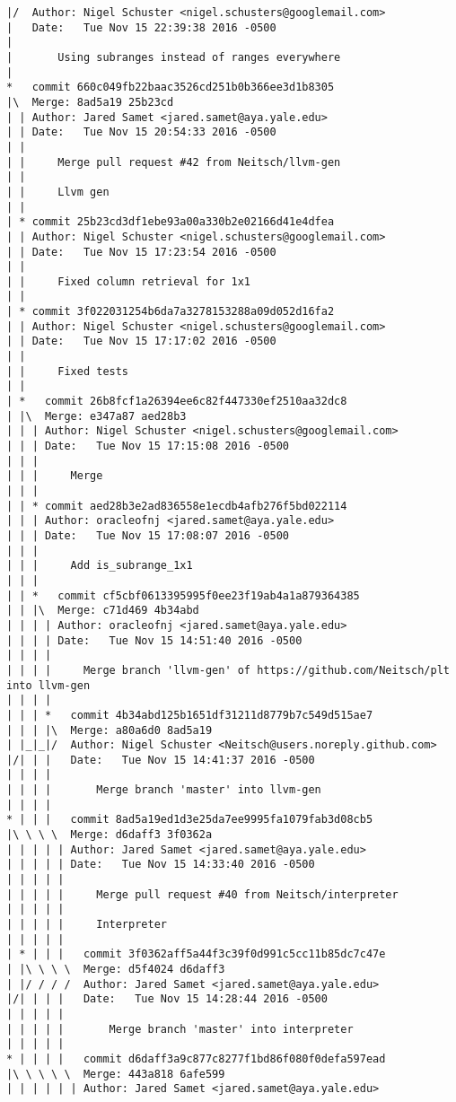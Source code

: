 \begin{lstlisting}
|/  Author: Nigel Schuster <nigel.schusters@googlemail.com>
|   Date:   Tue Nov 15 22:39:38 2016 -0500
|   
|       Using subranges instead of ranges everywhere
|    
*   commit 660c049fb22baac3526cd251b0b366ee3d1b8305
|\  Merge: 8ad5a19 25b23cd
| | Author: Jared Samet <jared.samet@aya.yale.edu>
| | Date:   Tue Nov 15 20:54:33 2016 -0500
| | 
| |     Merge pull request #42 from Neitsch/llvm-gen
| |     
| |     Llvm gen
| |   
| * commit 25b23cd3df1ebe93a00a330b2e02166d41e4dfea
| | Author: Nigel Schuster <nigel.schusters@googlemail.com>
| | Date:   Tue Nov 15 17:23:54 2016 -0500
| | 
| |     Fixed column retrieval for 1x1
| |   
| * commit 3f022031254b6da7a3278153288a09d052d16fa2
| | Author: Nigel Schuster <nigel.schusters@googlemail.com>
| | Date:   Tue Nov 15 17:17:02 2016 -0500
| | 
| |     Fixed tests
| |     
| *   commit 26b8fcf1a26394ee6c82f447330ef2510aa32dc8
| |\  Merge: e347a87 aed28b3
| | | Author: Nigel Schuster <nigel.schusters@googlemail.com>
| | | Date:   Tue Nov 15 17:15:08 2016 -0500
| | | 
| | |     Merge
| | |    
| | * commit aed28b3e2ad836558e1ecdb4afb276f5bd022114
| | | Author: oracleofnj <jared.samet@aya.yale.edu>
| | | Date:   Tue Nov 15 17:08:07 2016 -0500
| | | 
| | |     Add is_subrange_1x1
| | |      
| | *   commit cf5cbf0613395995f0ee23f19ab4a1a879364385
| | |\  Merge: c71d469 4b34abd
| | | | Author: oracleofnj <jared.samet@aya.yale.edu>
| | | | Date:   Tue Nov 15 14:51:40 2016 -0500
| | | | 
| | | |     Merge branch 'llvm-gen' of https://github.com/Neitsch/plt into llvm-gen
| | | |       
| | | *   commit 4b34abd125b1651df31211d8779b7c549d515ae7
| | | |\  Merge: a80a6d0 8ad5a19
| |_|_|/  Author: Nigel Schuster <Neitsch@users.noreply.github.com>
|/| | |   Date:   Tue Nov 15 14:41:37 2016 -0500
| | | |   
| | | |       Merge branch 'master' into llvm-gen
| | | |       
* | | |   commit 8ad5a19ed1d3e25da7ee9995fa1079fab3d08cb5
|\ \ \ \  Merge: d6daff3 3f0362a
| | | | | Author: Jared Samet <jared.samet@aya.yale.edu>
| | | | | Date:   Tue Nov 15 14:33:40 2016 -0500
| | | | | 
| | | | |     Merge pull request #40 from Neitsch/interpreter
| | | | |     
| | | | |     Interpreter
| | | | |        
| * | | |   commit 3f0362aff5a44f3c39f0d991c5cc11b85dc7c47e
| |\ \ \ \  Merge: d5f4024 d6daff3
| |/ / / /  Author: Jared Samet <jared.samet@aya.yale.edu>
|/| | | |   Date:   Tue Nov 15 14:28:44 2016 -0500
| | | | |   
| | | | |       Merge branch 'master' into interpreter
| | | | |        
* | | | |   commit d6daff3a9c877c8277f1bd86f080f0defa597ead
|\ \ \ \ \  Merge: 443a818 6afe599
| | | | | | Author: Jared Samet <jared.samet@aya.yale.edu>

\end{lstlisting}
